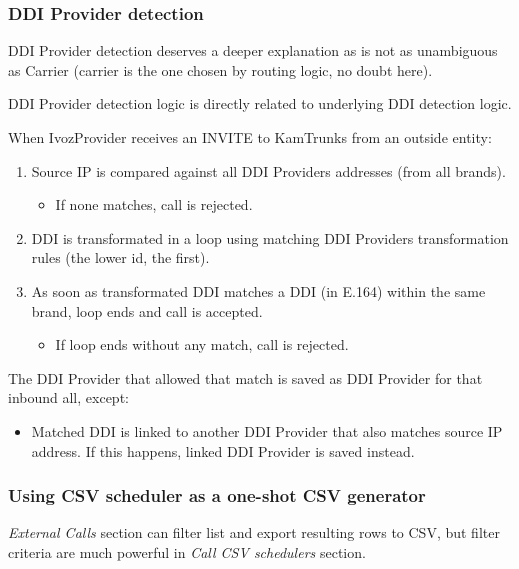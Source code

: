 \documentclass[letterpaper,10pt,spanish]{sphinxmanual}
\begin{document}
\subsubsection{DDI Provider detection}
\label{administration_portal/brand/calls/call_csv_schedulers:ddi-provider-detection}
DDI Provider detection deserves a deeper explanation as is not as unambiguous as Carrier (carrier is the one chosen by
routing logic, no doubt here).

DDI Provider detection logic is directly related to underlying DDI detection logic.

When IvozProvider receives an INVITE to KamTrunks from an outside entity:
\begin{enumerate}
\item {} 
Source IP is compared against all DDI Providers addresses (from all brands).
\begin{itemize}
\item {} 
If none matches, call is rejected.

\end{itemize}

\item {} 
DDI is transformated in a loop using matching DDI Providers transformation rules (the lower id, the first).

\item {} 
As soon as transformated DDI matches a DDI (in E.164) within the same brand, loop ends and call is accepted.
\begin{itemize}
\item {} 
If loop ends without any match, call is rejected.

\end{itemize}

\end{enumerate}

The DDI Provider that allowed that match is saved as DDI Provider for that inbound all, except:
\begin{itemize}
\item {} 
Matched DDI is linked to another DDI Provider that also matches source IP address. If this happens, linked DDI Provider
is saved instead.

\end{itemize}


\subsubsection{Using CSV scheduler as a one-shot CSV generator}
\label{administration_portal/brand/calls/call_csv_schedulers:using-csv-scheduler-as-a-one-shot-csv-generator}
\emph{External Calls} section can filter list and export resulting rows to CSV, but filter criteria are much powerful in
\emph{Call CSV schedulers} section.
\end{document}
